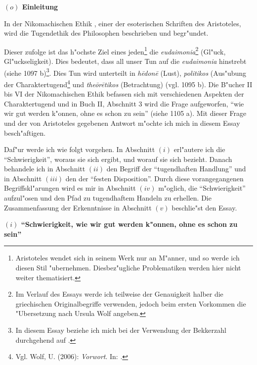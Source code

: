\documentclass[a4paper, emulatestandardclasses, 12pt]{scrartcl}
\begin{document}
\begin{onehalfspace} 



\noindent\textbf{$(o)$ Einleitung}

\noindent In der Nikomachischen Ethik \citep{wolf2006nikomachische}, einer der esoterischen Schriften des Aristoteles, wird die Tugendethik des Philosophen beschrieben und begr"undet.

Dieser zufolge ist das h"ochste Ziel eines jeden\footnote{Aristoteles wendet sich in seinem Werk nur an M"anner, und so werde ich diesen Stil "ubernehmen. Diesbez"ugliche Problematiken werden hier nicht weiter thematisiert.} die \emph{eudaimonia}\footnote{Im Verlauf des Essays werde ich teilweise der Genauigkeit halber die griechischen Originalbegriffe verwenden, jedoch beim ersten Vorkommen die "Ubersetzung nach Ursula Wolf angeben.} (Gl"uck, Gl"uckseligkeit). Dies bedeutet, dass all unser Tun auf die \emph{eudaimonia} hinstrebt (siehe 1097 b)\footnote{In diesem Essay beziehe ich mich bei der Verwendung der Bekkerzahl durchgehend auf \citep{wolf2006nikomachische}.}. Dies Tun wird unterteilt in \emph{h\={e}don\={e}} (Lust), \emph{politikos} (Aus"ubung der Charaktertugend\footnote{Vgl. Wolf, U. (2006): \emph{Vorwort}. In: \citep{wolf2006nikomachische}.} %
 und \emph{the\={o}r\={e}tikos} (Betrachtung) (vgl. 1095 b). Die B"ucher II bis VI der Nikomachischen Ethik befassen sich mit verschiedenen Aspekten der Charaktertugend und in Buch II, Abschnitt 3 wird die Frage aufgeworfen, "`wie wir gut werden k"onnen, ohne es schon zu sein"' (siehe 1105 a). Mit dieser Frage und der von Aristoteles gegebenen Antwort m"ochte ich mich in diesem Essay besch"aftigen.\newline

Daf"ur werde ich wie folgt vorgehen. In Abschnitt $(i)$ erl"autere ich die "`Schwierigkeit"', woraus sie sich ergibt, und worauf sie sich bezieht. Danach behandele ich in Abschnitt $(ii)$ den Begriff der "`tugendhaften Handlung"' und in Abschnitt $(iii)$ den der "`festen Disposition"'. Durch diese vorangegangenen Begriffskl"arungen wird es mir in Abschnitt $(iv)$ m"oglich, die "`Schwierigkeit"' aufzul"osen und den Pfad zu tugendhaftem Handeln zu erhellen. Die Zusammenfassung der Erkenntnisse in Abschnitt $(v)$ beschlie"st den Essay.

\vspace{5mm}

\noindent\textbf{$(i)$ "`Schwierigkeit, wie wir gut werden k"onnen, ohne es schon zu sein"'}


\end{onehalfspace}
\end{document}
